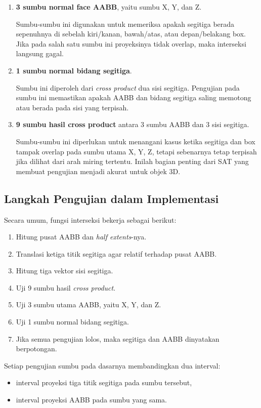 \documentclass[12pt, a4paper]{report}
\begin{document}
\begin{enumerate}
  \item \textbf{3 sumbu normal face AABB}, yaitu sumbu X, Y, dan Z.

  Sumbu-sumbu ini digunakan untuk memeriksa apakah segitiga berada
  sepenuhnya di sebelah kiri/kanan, bawah/atas, atau depan/belakang box.
  Jika pada salah satu sumbu ini proyeksinya tidak overlap, maka
  interseksi langsung gagal.

  \item \textbf{1 sumbu normal bidang segitiga}.

  Sumbu ini diperoleh dari \textit{cross product} dua sisi segitiga.
  Pengujian pada sumbu ini memastikan apakah AABB dan bidang segitiga
  saling memotong atau berada pada sisi yang terpisah.

  \item \textbf{9 sumbu hasil cross product} antara 3 sumbu AABB dan 3
  sisi segitiga.

  Sumbu-sumbu ini diperlukan untuk menangani kasus ketika segitiga dan
  box tampak overlap pada sumbu utama X, Y, Z, tetapi sebenarnya tetap
  terpisah jika dilihat dari arah miring tertentu. Inilah bagian penting
  dari SAT yang membuat pengujian menjadi akurat untuk objek 3D.
\end{enumerate}


\subsection{Langkah Pengujian dalam Implementasi}

Secara umum, fungsi interseksi bekerja sebagai berikut:
\begin{enumerate}
  \item Hitung pusat AABB dan \textit{half extents}-nya.
  \item Translasi ketiga titik segitiga agar relatif terhadap pusat
  AABB.
  \item Hitung tiga vektor sisi segitiga.
  \item Uji 9 sumbu hasil \textit{cross product}.
  \item Uji 3 sumbu utama AABB, yaitu X, Y, dan Z.
  \item Uji 1 sumbu normal bidang segitiga.
  \item Jika semua pengujian lolos, maka segitiga dan AABB dinyatakan
  berpotongan.
\end{enumerate}

Setiap pengujian sumbu pada dasarnya membandingkan dua interval:
\begin{itemize}
  \item interval proyeksi tiga titik segitiga pada sumbu tersebut,
  \item interval proyeksi AABB pada sumbu yang sama.
\end{itemize}
\end{document}
